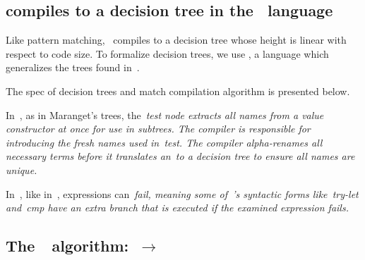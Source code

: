 \documentclass[article,screen,12pt, nonacm]{acmart}
\begin{document}
    \gfail



\subsection{\VMinus compiles to a decision tree in the ~\D language}
\label{d}

Like pattern matching, \VMinus~compiles to a decision tree whose height is 
linear with respect to code size. To formalize decision trees, we use 
\D, a language which generalizes the trees found in~\citet{maranget}. 

The spec of decision trees and match compilation algorithm is presented below. 





  
      












  In~\D, as in Maranget's trees, the~\it{test} node extracts all names from a
  value constructor at once for use in subtrees. The compiler is responsible for
  introducing the fresh names used in~\it{test}. The compiler alpha-renames all
  necessary terms before it translates an~\iffibf to a decision tree to ensure
  all names are unique. 

  In~\D, like in~\VMinus, expressions can~\it{fail}, meaning some of~\D's
  syntactic forms like~\it{try-let} and~\it{cmp} have an extra branch that is
  executed if the examined expression fails. 



    \subsection{The~\DTran\ algorithm:~\VMinus $\rightarrow$~\D}
\end{document}
